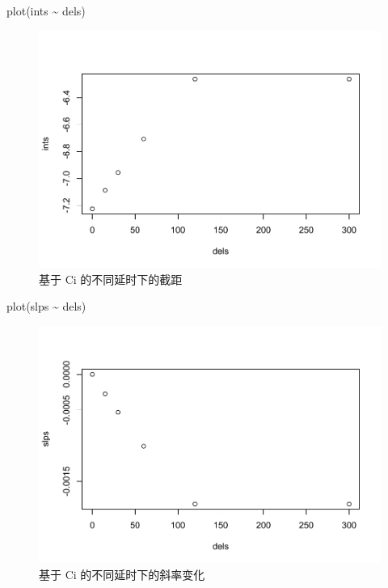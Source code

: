 \documentclass[
]{krantz}
\makeatletter
\newenvironment{Shaded}{\begin{snugshade}}{\end{snugshade}}
\newcommand{\FunctionTok}[1]{\textcolor[rgb]{0.00,0.00,0.00}{#1}}
\newcommand{\NormalTok}[1]{#1}
\newcommand{\SpecialCharTok}[1]{\textcolor[rgb]{0.00,0.00,0.00}{#1}}
\newenvironment{kframe}{%
\medskip{}
\setlength{\fboxsep}{.8em}
 \def\at@end@of@kframe{}%
 \ifinner\ifhmode%
  \def\at@end@of@kframe{\end{minipage}}%
  \begin{minipage}{\columnwidth}%
 \fi\fi%
 \def\FrameCommand##1{\hskip\@totalleftmargin \hskip-\fboxsep
 \colorbox{shadecolor}{##1}\hskip-\fboxsep
     \hskip-\linewidth \hskip-\@totalleftmargin \hskip\columnwidth}%
 \MakeFramed {\advance\hsize-\width
   \@totalleftmargin\z@ \linewidth\hsize
   \@setminipage}}%
 {\par\unskip\endMakeFramed%
 \at@end@of@kframe}
\renewenvironment{Shaded}{\begin{kframe}}{\end{kframe}}
\makeatother
\begin{document}
\begin{Shaded}
\begin{Highlighting}[]
\FunctionTok{plot}\NormalTok{(ints }\SpecialCharTok{\textasciitilde{}}\NormalTok{ dels)}
\end{Highlighting}
\end{Shaded}

\begin{figure}
\centering
\includegraphics{bookdown_files/figure-latex/intdelay-1.pdf}
\caption{\label{fig:intdelay}基于 Ci 的不同延时下的截距}
\end{figure}

\begin{Shaded}
\begin{Highlighting}[]
\FunctionTok{plot}\NormalTok{(slps }\SpecialCharTok{\textasciitilde{}}\NormalTok{ dels)}
\end{Highlighting}
\end{Shaded}

\begin{figure}
\centering
\includegraphics{bookdown_files/figure-latex/intslps-1.pdf}
\caption{\label{fig:intslps}基于 Ci 的不同延时下的斜率变化}
\end{figure}
\end{document}
